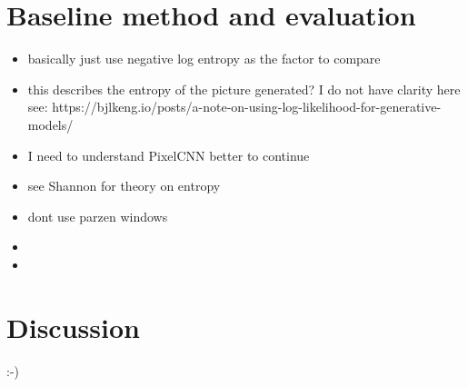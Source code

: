 \documentclass[10pt,a4paper,twoside]{article}
\begin{document}
\section{Baseline method and evaluation}

\begin{itemize}
    \item basically just use negative log entropy as the factor to compare
    \item this describes the entropy of the picture generated?
    I do not have clarity here see: https://bjlkeng.io/posts/a-note-on-using-log-likelihood-for-generative-models/
    \item I need to understand PixelCNN better to continue
    \item see Shannon for theory on entropy\cite{shannon}
    \item dont use parzen windows\cite{note_on_eval}
    \item
    \item
\end{itemize}

\section{Discussion}
:-)


\end{document}
